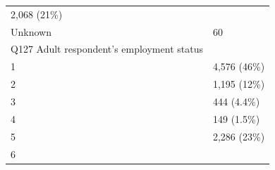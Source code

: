 \documentclass[]{article}
\begin{document}
\begin{longtable}[]{@{}ll@{}}
\begin{minipage}[t]{0.23\columnwidth}
2,068 (21\%)\strut
\end{minipage}\tabularnewline
\begin{minipage}[t]{0.71\columnwidth}\raggedright
Unknown\strut
\end{minipage} & \begin{minipage}[t]{0.23\columnwidth}\raggedright
60\strut
\end{minipage}\tabularnewline
\begin{minipage}[t]{0.71\columnwidth}\raggedright
Q127 Adult respondent's employment status\strut
\end{minipage} & \begin{minipage}[t]{0.23\columnwidth}\raggedright
\strut
\end{minipage}\tabularnewline
\begin{minipage}[t]{0.71\columnwidth}\raggedright
1\strut
\end{minipage} & \begin{minipage}[t]{0.23\columnwidth}\raggedright
4,576 (46\%)\strut
\end{minipage}\tabularnewline
\begin{minipage}[t]{0.71\columnwidth}\raggedright
2\strut
\end{minipage} & \begin{minipage}[t]{0.23\columnwidth}\raggedright
1,195 (12\%)\strut
\end{minipage}\tabularnewline
\begin{minipage}[t]{0.71\columnwidth}\raggedright
3\strut
\end{minipage} & \begin{minipage}[t]{0.23\columnwidth}\raggedright
444 (4.4\%)\strut
\end{minipage}\tabularnewline
\begin{minipage}[t]{0.71\columnwidth}\raggedright
4\strut
\end{minipage} & \begin{minipage}[t]{0.23\columnwidth}\raggedright
149 (1.5\%)\strut
\end{minipage}\tabularnewline
\begin{minipage}[t]{0.71\columnwidth}\raggedright
5\strut
\end{minipage} & \begin{minipage}[t]{0.23\columnwidth}\raggedright
2,286 (23\%)\strut
\end{minipage}\tabularnewline
\begin{minipage}[t]{0.71\columnwidth}\raggedright
6\strut
\end{minipage} & \begin{minipage}[t]{0.23\columnwidth}\raggedright

\end{minipage}
\end{longtable}
\end{document}
